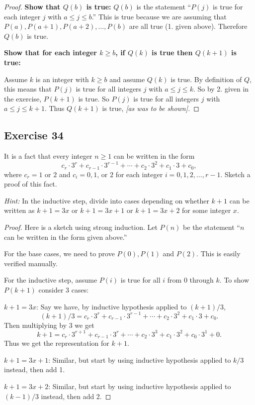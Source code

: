 \documentclass[14pt]{extarticle}
\begin{document}
\begin{proof}
    {\bf Show that $Q(b)$ is true:} $Q(b)$ is the statement ``$P(j)$ is true for each integer $j$ with $a \leq j \leq b$.''
    This is true because we are assuming that $P(a), P(a + 1), P(a + 2), \ldots, P(b)$ are all true (1. given above).
    Therefore $Q(b)$ is true.

        {\bf Show that for each integer $k \geq b$, if $Q(k)$ is true then $Q(k+1)$ is true:}

    Assume $k$ is an integer with $k \geq b$ and assume $Q(k)$ is true. By definition of $Q$, this means that $P(j)$ is
    true for all integers $j$ with $a \leq j \leq k$.
    So by 2. given in the exercise, $P(k+1)$ is true.
    So $P(j)$ is true for all integers $j$ with $a \leq j \leq k+1$. Thus $Q(k+1)$ is true, {\it [as was to be shown].}
\end{proof}

\subsection{Exercise 34}
It is a fact that every integer $n \geq 1$ can be written
in the form
\[
    c_r \cdot 3^r + c_{r-1} \cdot 3^{r-1} + \cdots + c_2 \cdot 3^2 + c_1 \cdot 3 + c_0,
\]
where $c_r = 1$ or $2$ and $c_i = 0, 1$, or $2$ for each
integer $i = 0, 1, 2, \ldots, r - 1$. Sketch a proof of this fact.

    {\it Hint:} In the inductive step, divide into cases depending on whether $k+1$ can be written as $k+1 = 3x$ or
$k+1 = 3x + 1$ or $k+1 = 3x + 2$ for some integer $x$.

\begin{proof}
    Here is a sketch using strong induction. Let $P(n)$ be the statement ``$n$ can be written in the form given above.''

    For the base cases, we need to prove $P(0), P(1)$ and $P(2)$. This is easily verified manually.

    For the inductive step, assume $P(i)$ is true for all $i$ from 0 through $k$. To show $P(k+1)$ consider 3 cases:

    $k + 1 = 3x$: Say we have, by inductive hypothesis applied to $(k+1)/3$,
    \[
        (k + 1) / 3 = c_r \cdot 3^r + c_{r-1} \cdot 3^{r-1} + \cdots + c_2 \cdot 3^2 + c_1 \cdot 3 + c_0.
    \]
    Then multiplying by 3 we get
    \[
        k + 1 = c_r \cdot 3^{r+1} + c_{r-1} \cdot 3^{r} + \cdots + c_2 \cdot 3^3 + c_1 \cdot 3^2 + c_0 \cdot 3^1 + 0.
    \]
    Thus we get the representation for $k+1$.

    $k + 1 = 3x+1$: Similar, but start by using inductive hypothesis applied to $k/3$ instead, then add 1.

    $k + 1 = 3x+2$: Similar, but start by using inductive hypothesis applied to $(k-1)/3$ instead, then add 2.
\end{proof}
\end{document}
